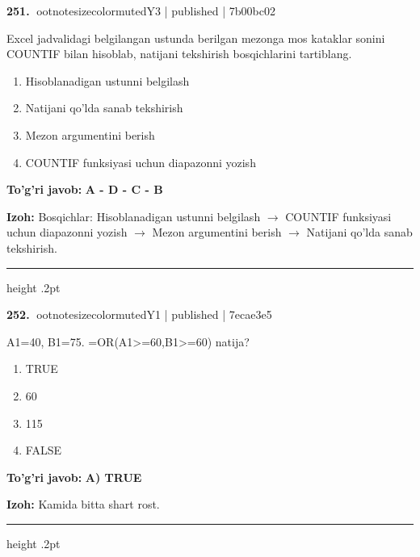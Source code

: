 \documentclass[10pt,a4paper]{article}
\begin{document}
\textbf{\color{ink}251.} {ootnotesizecolor{muted}Y3 | published | 7b00bc02}
\par
Excel jadvalidagi belgilangan ustunda berilgan mezonga mos kataklar sonini COUNTIF bilan hisoblab, natijani tekshirish bosqichlarini tartiblang.
\begin{enumerate}[label=\Alph*),leftmargin=9mm]
\item Hisoblanadigan ustunni belgilash
\item Natijani qo'lda sanab tekshirish
\item Mezon argumentini berish
\item COUNTIF funksiyasi uchun diapazonni yozish
\end{enumerate}
\begin{tcolorbox}[enhanced,breakable,colback=teal!4,colframe=teal!55!black,boxrule=0.45pt,arc=1.2mm,left=2.8mm,right=2.8mm,top=2mm,bottom=2mm]
\textbf{\color{teal}To'g'ri javob:} \textbf{A - D - C - B}
\par\smallskip
\textbf{Izoh:} Bosqichlar: Hisoblanadigan ustunni belgilash \ensuremath{\rightarrow} COUNTIF funksiyasi uchun diapazonni yozish \ensuremath{\rightarrow} Mezon argumentini berish \ensuremath{\rightarrow} Natijani qo'lda sanab tekshirish.
\end{tcolorbox}
\vspace{2mm}\hrule height .2pt\vspace{2mm}

\textbf{\color{ink}252.} {ootnotesizecolor{muted}Y1 | published | 7ecae3e5}
\par
A1=40, B1=75. =OR(A1\textgreater{}=60,B1\textgreater{}=60) natija?
\begin{enumerate}[label=\Alph*),leftmargin=9mm]
\item TRUE
\item 60
\item 115
\item FALSE
\end{enumerate}
\begin{tcolorbox}[enhanced,breakable,colback=teal!4,colframe=teal!55!black,boxrule=0.45pt,arc=1.2mm,left=2.8mm,right=2.8mm,top=2mm,bottom=2mm]
\textbf{\color{teal}To'g'ri javob:} \textbf{A) TRUE}
\par\smallskip
\textbf{Izoh:} Kamida bitta shart rost.
\end{tcolorbox}
\vspace{2mm}\hrule height .2pt\vspace{2mm}
\end{document}
